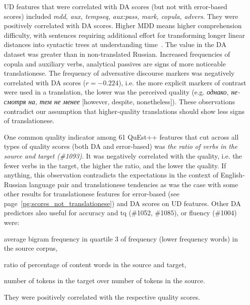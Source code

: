 UD features that were correlated with DA scores (but not with error-based scores) included \textit{mdd, aux, tempseq, aux:pass, mark, copula, advers}. They were positively correlated with DA scores. Higher MDD means higher comprehension difficulty, with sentences requiring additional effort for transforming longer linear distances into syntactic trees at understanding time~\cite[p.162]{Jing2015}. The value in the DA dataset was greater than in non-translated Russian. Increased frequencies of copula and auxiliary verbs, analytical passives are signs of more noticeable translationese. The frequency of adversative discourse markers was negatively correlated with DA scores ($r=-0.224$), i.e. the more explicit markers of contrast were used in a translation, the lower was the perceived quality (e.g. \foreignlanguage{russian}{\textit{однако, несмотря на, тем не менее}} [however, despite, nonetheless]).
These observations contradict our assumption that higher-quality translations should show less signs of translationese. 

One common quality indicator among 61 QuEst++ features that cut across all types of quality scores (both DA and error-based) was \textit{the ratio of verbs in the source and target (\#1093)}. It was negatively correlated with the quality, i.e. the fewer verbs in the target, the higher the ratio, and the lower the quality. %
If anything, this observation contradicts the expectations in the context of English-Russian language pair and translationese tendencies as was the case with some other results for translationese features for error-based (see page~\ref{pg:scores_not_translationese}) and DA scores on UD features. Other DA predictors also useful for accuracy and tq (\#1052, \#1085), or fluency (\#1004) were: 
\begin{description}\compresslist{}
	\item[1052] average bigram frequency in quartile 3 of frequency (lower frequency words) in the source corpus,
	\item[1085] ratio of percentage of content words in the source and target,
	\item[1004] number of tokens in the target over number of tokens in the source.
\end{description}
They were positively correlated with the respective quality scores. 

